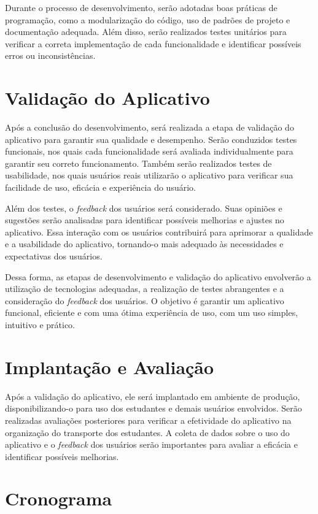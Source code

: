 \documentclass[
    12pt,                   %
    openright,              %
    oneside,                %
    a4paper,                %
    sumario=tradicional,    %
    english,                %
    brazil,                 %
    ]{abntex2}
\begin{document}
Durante o processo de desenvolvimento, serão adotadas boas práticas de programação, como a modularização do código, uso de padrões de projeto e documentação adequada. Além disso, serão realizados testes unitários para verificar a correta implementação de cada funcionalidade e identificar possíveis erros ou inconsistências.

\section{Validação do Aplicativo}
\label{sec:validacao-aplicativo}

Após a conclusão do desenvolvimento, será realizada a etapa de validação do aplicativo para garantir sua qualidade e desempenho. Serão conduzidos testes funcionais, nos quais cada funcionalidade será avaliada individualmente para garantir seu correto funcionamento. Também serão realizados testes de usabilidade, nos quais usuários reais utilizarão o aplicativo para verificar sua facilidade de uso, eficácia e experiência do usuário.

Além dos testes, o \textit{feedback} dos usuários será considerado. Suas opiniões e sugestões serão analisadas para identificar possíveis melhorias e ajustes no aplicativo. Essa interação com os usuários contribuirá para aprimorar a qualidade e a usabilidade do aplicativo, tornando-o mais adequado às necessidades e expectativas dos usuários.

Dessa forma, as etapas de desenvolvimento e validação do aplicativo envolverão a utilização de tecnologias adequadas, a realização de testes abrangentes e a consideração do \textit{feedback} dos usuários. O objetivo é garantir um aplicativo funcional, eficiente e com uma ótima experiência de uso, com um uso simples, intuitivo e prático.

\section{Implantação e Avaliação}

Após a validação do aplicativo, ele será implantado em ambiente de produção, disponibilizando-o para uso dos estudantes e demais usuários envolvidos. Serão realizadas avaliações posteriores para verificar a efetividade do aplicativo na organização do transporte dos estudantes. A coleta de dados sobre o uso do aplicativo e o \textit{feedback} dos usuários serão importantes para avaliar a eficácia e identificar possíveis melhorias.


\section{Cronograma}
\label{sec:cronograma}
\end{document}
